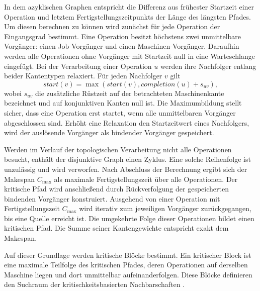 In dem azyklischen Graphen entspricht die Differenz aus frühester Startzeit einer Operation und letztem Fertigstellungszeitpunkts der Länge des längsten Pfades. 
Um diesen berechnen zu können wird zunächst für jede Operation der Eingangsgrad bestimmt.
Eine Operation besitzt höchstens zwei unmittelbare Vorgänger: einen Job-Vorgänger und einen Maschinen-Vorgänger.
Daraufhin werden alle Operationen ohne Vorgänger mit Startzeit null in eine Warteschlange eingefügt.
Bei der Verarbeitung einer Operation $u$ werden ihre Nachfolger entlang beider Kantentypen relaxiert.
Für jeden Nachfolger $v$ gilt
\[
    start(v) = \max\left(start(v), completion(u) + s_{uv}\right),
\]
wobei $s_{uv}$ die zusätzliche Rüstzeit auf der betrachteten Maschinenkante bezeichnet und auf konjunktiven Kanten null ist.
Die Maximumbildung stellt sicher, dass eine Operation erst startet, wenn alle unmittelbaren Vorgänger abgeschlossen sind.
Erhöht eine Relaxation den Startzeitwert eines Nachfolgers, wird der auslösende Vorgänger als bindender Vorgänger gespeichert.

Werden im Verlauf der topologischen Verarbeitung nicht alle Operationen besucht, enthält der disjunktive Graph einen Zyklus.
Eine solche Reihenfolge ist unzulässig und wird verworfen.
Nach Abschluss der Berechnung ergibt sich der Makespan $C_{\max}$ als maximale Fertigstellungszeit über alle Operationen.
Der kritische Pfad wird anschließend durch Rückverfolgung der gespeicherten bindenden Vorgänger konstruiert.
Ausgehend von einer Operation mit Fertigstellungszeit $C_{\max}$ wird iterativ zum jeweiligen Vorgänger zurückgegangen, bis eine Quelle erreicht ist.
Die umgekehrte Folge dieser Operationen bildet einen kritischen Pfad.
Die Summe seiner Kantengewichte entspricht exakt dem Makespan.

Auf dieser Grundlage werden kritische Blöcke bestimmt.
Ein kritischer Block ist eine maximale Teilfolge des kritischen Pfades, deren Operationen auf derselben Maschine liegen und dort unmittelbar aufeinanderfolgen.
Diese Blöcke definieren den Suchraum der kritischkeitsbasierten Nachbarschaften \cite{nowicki_fast_1996}.

